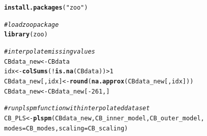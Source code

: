 \documentclass{article}\usepackage[]{graphicx}\usepackage[]{color}
\makeatletter
\newcommand{\hlnum}[1]{\textcolor[rgb]{0.686,0.059,0.569}{#1}}%
\newcommand{\hlstr}[1]{\textcolor[rgb]{0.192,0.494,0.8}{#1}}%
\newcommand{\hlcom}[1]{\textcolor[rgb]{0.678,0.584,0.686}{\textit{#1}}}%
\newcommand{\hlopt}[1]{\textcolor[rgb]{0,0,0}{#1}}%
\newcommand{\hlstd}[1]{\textcolor[rgb]{0.345,0.345,0.345}{#1}}%
\newcommand{\hlkwb}[1]{\textcolor[rgb]{0.69,0.353,0.396}{#1}}%
\newcommand{\hlkwc}[1]{\textcolor[rgb]{0.333,0.667,0.333}{#1}}%
\newcommand{\hlkwd}[1]{\textcolor[rgb]{0.737,0.353,0.396}{\textbf{#1}}}%
\newenvironment{kframe}{%
 \def\at@end@of@kframe{}%
 \ifinner\ifhmode%
  \def\at@end@of@kframe{\end{minipage}}%
  \begin{minipage}{\columnwidth}%
 \fi\fi%
 \def\FrameCommand##1{\hskip\@totalleftmargin \hskip-\fboxsep
 \colorbox{shadecolor}{##1}\hskip-\fboxsep
     \hskip-\linewidth \hskip-\@totalleftmargin \hskip\columnwidth}%
 \MakeFramed {\advance\hsize-\width
   \@totalleftmargin\z@ \linewidth\hsize
   \@setminipage}}%
 {\par\unskip\endMakeFramed%
 \at@end@of@kframe}
\newenvironment{knitrout}{}{} %
\makeatother
\begin{document}
\begin{knitrout}
\color{fgcolor}\begin{kframe}
\begin{alltt}
\hlkwd{install.packages}\hlstd{(}\hlstr{"zoo"}\hlstd{)}
\end{alltt}
\end{kframe}
\end{knitrout}

\begin{knitrout}
\color{fgcolor}\begin{kframe}
\begin{alltt}
\hlcom{#load zoo package}
\hlkwd{library}\hlstd{(zoo)}

\hlcom{#interpolate missing values}
\hlstd{CBdata_new} \hlkwb{<-} \hlstd{CBdata}
\hlstd{idx} \hlkwb{<-} \hlkwd{colSums}\hlstd{(}\hlopt{!}\hlkwd{is.na}\hlstd{(CBdata))} \hlopt{>} \hlnum{1}
\hlstd{CBdata_new[ , idx]} \hlkwb{<-} \hlkwd{round}\hlstd{(}\hlkwd{na.approx}\hlstd{(CBdata_new[ , idx]))}
\hlstd{CBdata_new} \hlkwb{<-} \hlstd{CBdata_new[}\hlopt{-}\hlnum{261}\hlstd{,]}

\hlcom{#run plspm function with interpolated dataset}
\hlstd{CB_PLS} \hlkwb{<-} \hlkwd{plspm}\hlstd{(CBdata_new,CB_inner_model,CB_outer_model,}
                \hlkwc{modes} \hlstd{= CB_modes,} \hlkwc{scaling} \hlstd{= CB_scaling)}


\end{alltt}
\end{kframe}
\end{knitrout}
\end{document}
